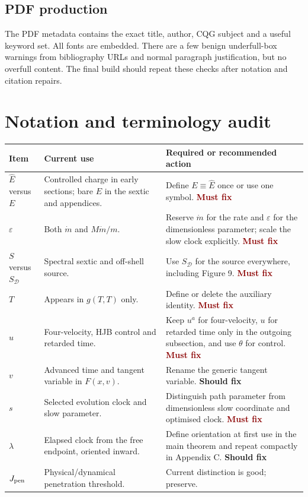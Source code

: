 \documentclass[11pt,a4paper]{article}
\newcommand{\must}{\textcolor{DarkRed}{\textbf{Must fix}}}
\newcommand{\should}{\textcolor{Amber}{\textbf{Should fix}}}
\newcommand{\Ehat}{\hat E}
\newcommand{\SD}{S_{\mathcal D}}
\begin{document}
\subsection{PDF production}

The PDF metadata contains the exact title, author, CQG subject and a useful keyword set. All
fonts are embedded. There are a few benign underfull-box warnings from bibliography URLs and
normal paragraph justification, but no overfull content. The final build should repeat these
checks after notation and citation repairs.

\clearpage
\section{Notation and terminology audit}

\begin{longtable}{@{}p{}p{}p{}@{}}
\toprule
Item & Current use & Required or recommended action \\
\midrule
\endhead
$\Ehat$ versus $E$ & Controlled charge in early sections; bare $E$ in the sextic and appendices. &
Define $E\equiv\Ehat$ once or use one symbol. \must \\
$\varepsilon$ & Both $\dot m$ and $M\dot m/m$. & Reserve $\dot m$ for the rate and $\varepsilon$
for the dimensionless parameter; scale the slow clock explicitly. \must \\
$S$ versus $\SD$ & Spectral sextic and off-shell source. & Use $\SD$ for the source everywhere,
including Figure 9. \must \\
$T$ & Appears in $g(T,T)$ only. & Define or delete the auxiliary identity. \must \\
$u$ & Four-velocity, HJB control and retarded time. & Keep $u^a$ for four-velocity, $u$ for retarded
time only in the outgoing subsection, and use $\theta$ for control. \must \\
$v$ & Advanced time and tangent variable in $F(x,v)$. & Rename the generic tangent variable. \should \\
$s$ & Selected evolution clock and slow parameter. & Distinguish path parameter from dimensionless
slow coordinate and optimised clock. \must \\
$\lambda$ & Elapsed clock from the free endpoint, oriented inward. & Define orientation at first use
in the main theorem and repeat compactly in Appendix C. \should \\
$J_{\rm pen}$ & Physical/dynamical penetration threshold. & Current distinction is good; preserve. \\

\end{longtable}
\end{document}
